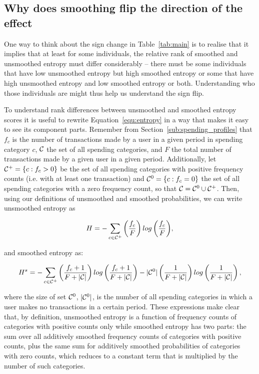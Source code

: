 \subsection{Why does smoothing flip the direction of the effect}%
\label{sub:why_does_smoothing_flip_the_direction_of_the_effect}

One way to think about the sign change in Table~\ref{tab:main} is to realise
that it implies that at least for some individuals, the relative rank of
smoothed and unsmoothed entropy must differ considerably -- there must be some
individuals that have low unsmoothed entropy but high smoothed entropy or some
that have high unsmoothed entropy and low smoothed entropy or both.
Understanding who those individuals are might thus help us understand the sign
flip.

To understand rank differences between unsmoothed and smoothed entropy scores
it is useful to rewrite Equation~\ref{equ:entropy} in a way that makes it easy
to see its component parts. Remember from Section~\ref{sub:spending_profiles}
that $f_c$ is the number of transactions made by a user in a given period in
spending category $c$, $\mathcal{C}$ the set of all spending categories, and $F$ the
total number of transactions made by a given user in a given period.
Additionally, let $\mathcal{C}^{+} = \{c: f_c > 0\}$ be the set of all spending
categories with positive frequency counts (i.e.  with at least one transaction)
and $\mathcal{C}^{0} = \{c: f_c = 0\}$ the set of all spending categories with a zero
frequency count, so that $\mathcal{C} = \mathcal{C}^{0} \cup \mathcal{C}^{+}$. Then, using our
definitions of unsmoothed and smoothed probabilities, we can write unsmoothed
entropy as

\begin{equation}
\label{equ:entropy_us}
H = -\sum_{c \in \mathcal{C}^{+}}{\left(\frac{f_c}{F}\right)
log\left(\frac{f_c}{F}\right)},
\end{equation}

and smoothed entropy as:

\begin{equation}
\label{equ:entropy_s}
H^s = -\sum_{c \in \mathcal{C}^{+}}{\left(\frac{f_c + 1}{F + |\mathcal{C}|}\right)
log\left(\frac{f_c + 1}{F + |\mathcal{C}|}\right)}
- |\mathcal{C}^{0}|\left(\frac{1}{F + |\mathcal{C}|}\right)
log\left(\frac{1}{F + |\mathcal{C}|}\right),
\end{equation}

\noindent where the size of set $\mathcal{C}^{0}$, $|\mathcal{C}^{0}|$, is the number of all
spending categories in which a user makes no transactions in a certain period.
These expressions make clear that, by definition, unsmoothed entropy is a
function of frequency counts of categories with positive counts only while
smoothed entropy has two parts: the sum over all additively smoothed frequency
counts of categories with positive counts, plus the same sum for additively
smoothed probabilities of categories with zero counts, which reduces to a
constant term that is multiplied by the number of such categories.

